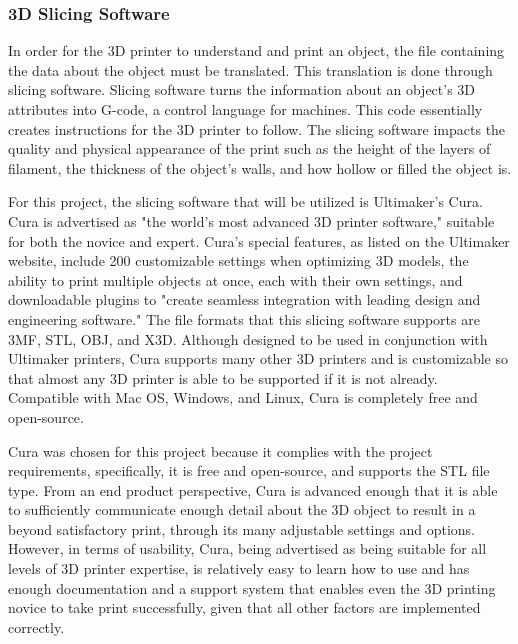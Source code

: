 \documentclass[letterpaper, onecolumn, draftclsnofoot, 10pt, compsoc]{IEEEtran}
\begin{document}
\begin{singlespace}
        \subsubsection{3D Slicing Software}
	In order for the 3D printer to understand and print an object, the file containing the data about the object must be translated.
	This translation is done through slicing software.
	Slicing software turns the information about an object's 3D attributes into G-code, a control language for machines. 
	This code essentially creates instructions for the 3D printer to follow. \cite{whatisweb} 
    The slicing software impacts the quality and physical appearance of the print such as the height of the layers of filament, the thickness of the object's walls, and how hollow or filled the object is. \par
	For this project, the slicing software that will be utilized is Ultimaker’s Cura.
	Cura is advertised as "the world's most advanced 3D printer software," suitable for both the novice and expert. 
	Cura's special features, as listed on the Ultimaker website, include 200 customizable settings when optimizing 3D models, the ability to print multiple objects at once, each with their own settings, and downloadable plugins to "create seamless integration with leading design and engineering software." \cite{curaweb}
	The file formats that this slicing software supports are 3MF, STL, OBJ, and X3D.
	Although designed to be used in conjunction with Ultimaker printers, Cura supports many other 3D printers and is customizable so that almost any 3D printer is able to be supported if it is not already.
	Compatible with Mac OS, Windows, and Linux, Cura is completely free and open-source. \cite{curaweb} \par
	    Cura was chosen for this project because it complies with the project requirements, specifically, it is free and open-source, and supports the STL file type. 
    From an end product perspective, Cura is advanced enough that it is able to sufficiently communicate enough detail about the 3D object to result in a beyond satisfactory print, through its many adjustable settings and options.
    However, in terms of usability, Cura, being advertised as being suitable for all levels of 3D printer expertise, is relatively easy to learn how to use and has enough documentation and a support system that enables even the 3D printing novice to take print successfully, given that all other factors are implemented correctly.
    

\end{singlespace}
\end{document}

